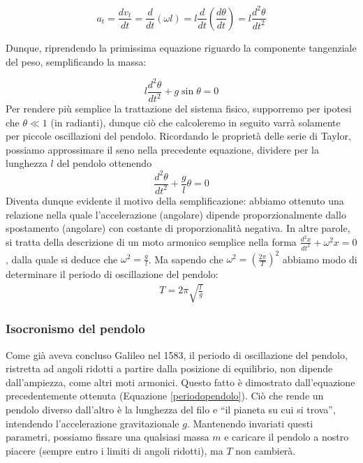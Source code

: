 \[ a_t = \frac{dv_t}{dt} = \frac{d}{dt} (\omega l) = l \frac{d}{dt}\left(\frac{d\theta}{dt}\right) = l\frac{d^2\theta}{dt^2} \]

\noindent Dunque, riprendendo la primissima equazione riguardo la componente
tangenziale del peso, semplificando la massa:

\[ l\frac{d^2\theta}{dt^2} + g\sin\theta = 0 \]
Per rendere più semplice la trattazione del sistema fisico, supporremo
per ipotesi che $\theta\ll 1$ (in radianti), dunque ciò che calcoleremo
in seguito varrà solamente per piccole oscillazioni del pendolo.
Ricordando le proprietà delle serie di Taylor, possiamo approssimare
il seno nella precedente equazione, dividere per la lunghezza $l$ del
pendolo ottenendo
\[ \frac{d^2\theta}{dt^2} + \frac{g}{l}\theta = 0 \]
Diventa dunque evidente il motivo della semplificazione: abbiamo ottenuto
una relazione nella quale l'accelerazione (angolare) dipende proporzionalmente
dallo spostamento (angolare) con costante di proporzionalità negativa.
In altre parole, si tratta della descrizione di un moto armonico semplice
nella forma $\frac{d^2x}{dt^2} + \omega^2 x = 0$, dalla quale si deduce
che $\omega^2 = \frac{g}{l}$. Ma sapendo che $\omega^2 = (\frac{2\pi}{T})^2$
abbiamo modo di determinare il periodo di oscillazione del pendolo:
\begin{align}
    T = 2\pi\sqrt{\frac{l}{g}}
    \label{periodopendolo}
\end{align}


\subsubsection*{Isocronismo del pendolo}
Come già aveva concluso Galileo nel 1583, il periodo di oscillazione
del pendolo, ristretta ad angoli ridotti a partire dalla posizione
di equilibrio, non dipende dall'ampiezza, come altri moti armonici.
Questo fatto è dimostrato dall'equazione precedentemente ottenuta
(Equazione \ref{periodopendolo}). Ciò che rende un pendolo diverso
dall'altro è la lunghezza del filo e ``il pianeta su cui si trova'',
intendendo l'accelerazione gravitazionale $g$. Mantenendo invariati
questi parametri, possiamo fissare una qualsiasi massa $m$ e caricare
il pendolo a nostro piacere (sempre entro i limiti di angoli ridotti),
ma $T$ non cambierà.

